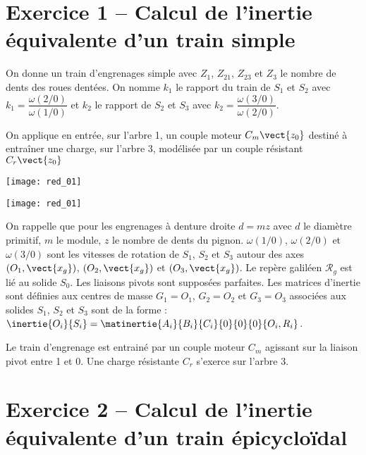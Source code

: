\ifprof
\else
\begin{multicols}{2}
\fi



\section*{Exercice 1 -- Calcul de l'inertie équivalente d'un train simple}

On donne un train d'engrenages simple avec $Z_1$, $Z_{21}$, $Z_{23}$ et $Z_3$ le nombre de dents des roues dentées. On nomme $k_1$ le rapport du train de $S_1$ et $S_2$ avec $k_1=\dfrac{\omega(2/0)}{\omega(1/0)}$ et  
$k_2$ le rapport de $S_2$ et $S_3$ avec $k_2=\dfrac{\omega(3/0)}{\omega(2/0)}$. 

On applique en entrée, sur l'arbre 1, un couple moteur $C_m\vect{z_0}$ destiné à entraîner une charge, sur l'arbre 3, modélisée par un couple résistant  $C_r\vect{z_0}$

\ifprof
\begin{center}
\texttt{[image: red\_01]}
\end{center}
\else
\begin{center}
\texttt{[image: red\_01]}
\end{center}
\fi
On rappelle que pour les engrenages à denture droite $d=mz$ avec $d$ le diamètre primitif, $m$ le module, $z$ le nombre de dents du pignon. $\omega(1/0)$, $\omega(2/0)$ et $\omega(3/0)$ sont les vitesses de rotation de $S_1$, $S_2$ et $S_3$ autour des axes $\left(O_1,\vect{x_g}\right)$, $\left(O_2,\vect{x_g}\right)$ et $\left(O_3,\vect{x_g}\right)$. Le repère galiléen $\mathcal{R}_g$ est lié au solide $S_0$. Les liaisons pivots sont supposées parfaites. Les matrices d'inertie sont définies aux centres de masse $G_1=O_1$, $G_2=O_2$ et $G_3=O_3$ associées aux solides $S_1$, $S_2$ et $S_3$ sont de la forme : $\inertie{O_i}{S_i}=\matinertie{A_i}{B_i}{C_i}{0}{0}{0}{O_i,R_i}$.

Le train d'engrenage est entrainé par un couple moteur $C_m$ agissant sur la liaison pivot entre 1 et 0. Une charge résistante $C_r$ s'exerce sur l'arbre 3. 




\section*{Exercice 2 -- Calcul de l'inertie équivalente d'un train épicycloïdal}
\setcounter{exo}{0}


\end{multicols}
